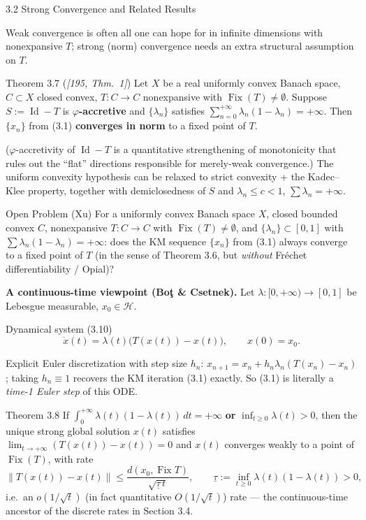 \documentclass[aspectratio=169,10pt]{beamer}
\newcommand{\cH}{\mathcal{H}}
\newcommand{\Fix}{\operatorname{Fix}}
\newcommand{\norm}[1]{\left\|#1\right\|}
\begin{document}
\begin{frame}[allowframebreaks]{3.2 Strong Convergence and Related Results}

  Weak convergence is often all one can hope for in infinite dimensions
  with nonexpansive $T$; strong (norm) convergence needs an extra
  structural assumption on $T$.

  \begin{block}{Theorem 3.7 (\emph{[195, Thm.\ 1]})}
    Let $X$ be a real uniformly convex Banach space, $C\subset X$
    closed convex, $T:C\to C$ nonexpansive with $\Fix(T)\ne\emptyset$.
    Suppose $S:=\operatorname{Id}-T$ is \textbf{$\varphi$-accretive} and
    $\{\lambda_n\}$ satisfies $\sum_{n=0}^{+\infty}\lambda_n(1-\lambda_n)=+\infty$.
    Then $\{x_n\}$ from (3.1) \textbf{converges in norm} to a fixed
    point of $T$.
  \end{block}
  ($\varphi$-accretivity of $\operatorname{Id}-T$ is a quantitative
  strengthening of monotonicity that rules out the ``flat'' directions
  responsible for merely-weak convergence.) The uniform convexity
  hypothesis can be relaxed to strict convexity + the Kadec--Klee
  property, together with demiclosedness of $S$ and $\lambda_n\le c<1$,
  $\sum\lambda_n=+\infty$.

  \begin{block}{Open Problem (Xu)}
    For a uniformly convex Banach space $X$, closed bounded convex
    $C$, nonexpansive $T:C\to C$ with $\Fix(T)\ne\emptyset$, and
    $\{\lambda_n\}\subset[0,1]$ with $\sum\lambda_n(1-\lambda_n)=+\infty$:
    does the KM sequence $\{x_n\}$ from (3.1) always converge to a
    fixed point of $T$ (in the sense of Theorem 3.6, but \emph{without}
    Fr\'echet differentiability / Opial)?
  \end{block}

  \framebreak

  \textbf{A continuous-time viewpoint (Bo\c t \& Csetnek).} Let
  $\lambda:[0,+\infty)\to[0,1]$ be Lebesgue measurable, $x_0\in\cH$.
  \begin{block}{Dynamical system (3.10)}
    $$\dot x(t)=\lambda(t)\bigl(T(x(t))-x(t)\bigr), \qquad x(0)=x_0.$$
  \end{block}
  Explicit Euler discretization with step size $h_n$:
  $x_{n+1}=x_n+h_n\lambda_n(T(x_n)-x_n)$; taking $h_n\equiv1$ recovers
  the KM iteration (3.1) exactly. So (3.1) is literally a
  \emph{time-1 Euler step} of this ODE.

  \begin{block}{Theorem 3.8}
    If $\int_0^{+\infty}\lambda(t)(1-\lambda(t))\,dt=+\infty$ \textbf{or}
    $\inf_{t\ge0}\lambda(t)>0$, then the unique strong global solution
    $x(t)$ satisfies $\lim_{t\to+\infty}(T(x(t))-x(t))=0$ and $x(t)$
    converges weakly to a point of $\Fix(T)$, with rate
    $$\norm{T(x(t))-x(t)}\le\frac{d(x_0,\Fix T)}{\sqrt{\underline\tau\, t}},
    \qquad \underline\tau:=\inf_{t\ge0}\lambda(t)(1-\lambda(t))>0,$$
    i.e.\ an $o(1/\sqrt t)$ (in fact quantitative $O(1/\sqrt t)$) rate ---
    the continuous-time ancestor of the discrete rates in Section 3.4.
  \end{block}
\end{frame}
\end{document}
